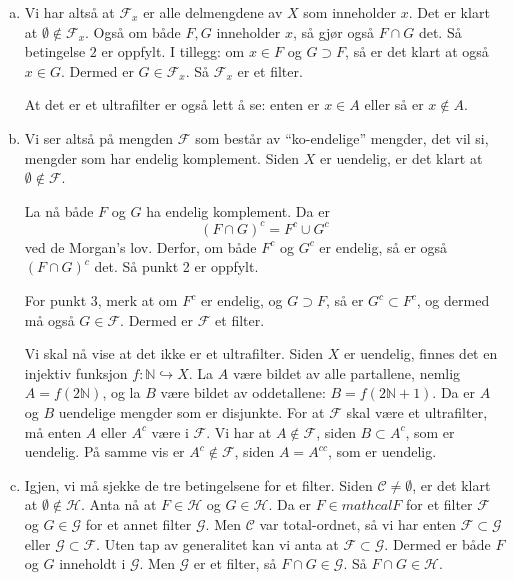 \documentclass[11pt, norsk]{article}
\begin{document}
\begin{enumerate}[a)]
\item Vi har altså at $\mathcal F_x$ er alle delmengdene av $X$ som inneholder $x$. Det er klart at $\emptyset \not \in \mathcal F_x$.  Også om både $F,G$ inneholder $x$, så gjør også $F \cap G$ det. Så betingelse $2$ er oppfylt. I tillegg: om $x \in F$ og $G \supset F$, så er det klart at også $x \in G$. Dermed er $G \in \mathcal F_x$. Så $\mathcal F_x$ er et filter.

At det er et ultrafilter er også lett å se: enten er $x \in A$ eller så er $x \not \in A$.
\item Vi ser altså på mengden $\mathcal F$ som består av ``ko-endelige'' mengder, det vil si, mengder som har endelig komplement. Siden $X$ er uendelig, er det klart at $\emptyset \not \in \mathcal F$. 

La nå både $F$ og $G$ ha endelig komplement. Da er
$$
(F \cap G)^c = F^c \cup G^c
$$
ved de Morgan's lov. Derfor, om både $F^c$ og $G^c$ er endelig, så er også $(F \cap G)^c$ det. Så punkt 2 er oppfylt.

For punkt 3, merk at om $F^c$ er endelig, og $G \supset F$, så er $G^c \subset F^c$, og dermed må også $G \in \mathcal F$. Dermed er $\mathcal F$ et filter.

Vi skal nå vise at det ikke er et ultrafilter. Siden $X$ er uendelig, finnes det en injektiv funksjon $f:\mathbb N \hookrightarrow X$. La $A$ være bildet av alle partallene, nemlig $A=f(2 \mathbb N)$, og la $B$ være bildet av oddetallene: $B= f(2\mathbb N + 1)$. Da er $A$ og $B$ uendelige mengder som er disjunkte. For at $\mathcal F$ skal være et ultrafilter, må enten $A$ eller $A^c$ være i $\mathcal F$. Vi har at $A \not \in \mathcal F$, siden $B \subset A^c$, som er uendelig. På samme vis er $A^c \not \in \mathcal F$, siden $A = A^{cc}$, som er uendelig. 

\item Igjen, vi må sjekke de tre betingelsene for et filter. Siden $\mathscr C \neq \emptyset$, er det klart at $\emptyset \not \in \mathcal H$. Anta nå at $F \in \mathcal H$ og $G \in \mathcal H$. Da er $F \in mathcal F$ for et filter $\mathcal F$ og $G \in \mathcal G$ for et annet filter $\mathcal G$. Men $\mathscr C$ var total-ordnet, så vi har enten $\mathcal F \subset \mathcal G$ eller $\mathcal G \subset \mathcal F$. Uten tap av generalitet kan vi anta at $\mathcal F \subset \mathcal G$. Dermed er både $F$ og $G$ inneholdt i $\mathcal G$. Men $\mathcal G$ er et filter, så $F \cap G \in \mathcal G$. Så $F \cap G \in \mathcal H$.


\end{enumerate}
\end{document}

